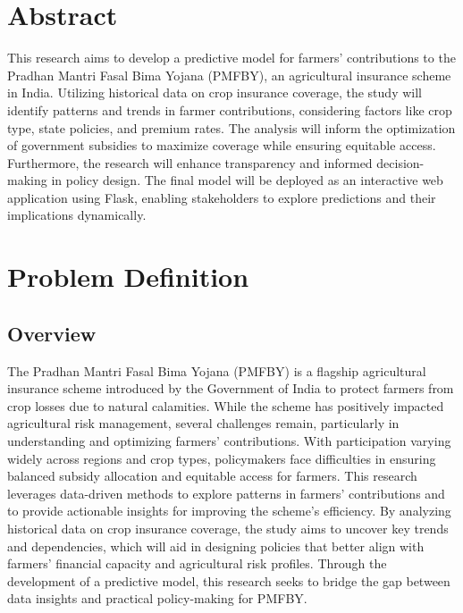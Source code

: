 \documentclass[12pt]{article}
\begin{document}
\section{Abstract}
This research aims to develop a predictive model for farmers' contributions to the Pradhan Mantri Fasal Bima Yojana (PMFBY), 
an agricultural insurance scheme in India. Utilizing historical data on crop insurance coverage, the study will identify patterns and trends in farmer contributions, 
considering factors like crop type, state policies, and premium rates. The analysis will inform the optimization of government subsidies to maximize coverage 
while ensuring equitable access. Furthermore, the research will enhance transparency and informed decision-making in policy design. 
The final model will be deployed as an interactive web application using Flask, enabling stakeholders to explore predictions and their implications dynamically.

\section{Problem Definition}
\subsection{Overview }
The Pradhan Mantri Fasal Bima Yojana (PMFBY) is a flagship agricultural insurance scheme introduced by the Government of India 
to protect farmers from crop losses due to natural calamities. While the scheme has positively impacted agricultural risk management, several challenges remain, 
particularly in understanding and optimizing farmers' contributions. With participation varying widely across regions and crop types, policymakers face difficulties 
in ensuring balanced subsidy allocation and equitable access for farmers. This research leverages data-driven methods to explore patterns in farmers' contributions 
and to provide actionable insights for improving the scheme's efficiency.
\vspace{5pt}
By analyzing historical data on crop insurance coverage, the study aims to uncover key trends and dependencies, which will aid in designing policies that better align
 with farmers' financial capacity and agricultural risk profiles. Through the development of a predictive model, this research seeks to bridge the gap between data insights and practical policy-making for PMFBY.
\end{document}
